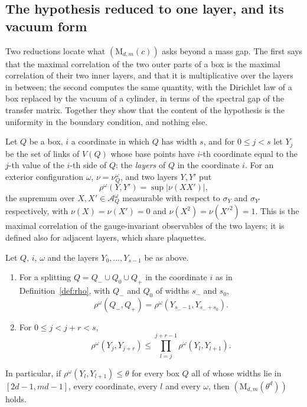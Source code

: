 \subsection{The hypothesis reduced to one layer, and its vacuum form}
\label{ssec:layers}

Two reductions locate what $(\mathrm M_{d,m}(c))$ asks beyond a mass gap.
The first says that the maximal correlation of the two outer parts of a box
is the maximal correlation of their two inner layers, and that it is
multiplicative over the layers in between; the second computes the same
quantity, with the Dirichlet law of a box replaced by the vacuum of a
cylinder, in terms of the spectral gap of the transfer matrix. Together they
show that the content of the hypothesis is the uniformity in the boundary
condition, and nothing else.

Let $Q$ be a box, $i$ a coordinate in which $Q$ has width $s$, and for
$0\le j<s$ let $Y_j$ be the set of links of $V(Q)$ whose base points have
$i$-th coordinate equal to the $j$-th value of the $i$-th side of $Q$: the
\emph{layers} of $Q$ in the coordinate $i$. For an exterior configuration
$\omega$, $\nu=\nu^\omega_Q$, and two layers $Y,Y'$ put
\[
\rho^\omega(Y,Y')=\sup|\nu(XX')|,
\]
the supremum over $X,X'\in\mathcal A^\omega_Q$ measurable with respect to
$\sigma_Y$ and $\sigma_{Y'}$ respectively, with $\nu(X)=\nu(X')=0$ and
$\nu(X^2)=\nu(X'^2)=1$. This is the maximal correlation of the gauge-invariant
observables of the two layers; it is defined also for adjacent layers,
which share plaquettes.

\begin{lemma}[layers]\label{lem:layers}
Let $Q$, $i$, $\omega$ and the layers $Y_0,\dots,Y_{s-1}$ be as above.
\begin{enumerate}[label=\textup{(\roman*)},leftmargin=*]
\item For a splitting $Q=Q_-\cup Q_0\cup Q_+$ in the coordinate $i$ as in
Definition~\textup{\ref{def:rho}}, with $Q_-$ and $Q_0$ of widths $s_-$ and
$s_0$,
\[
\rho^\omega(Q_-,Q_+)=\rho^\omega(Y_{s_--1},Y_{s_-+s_0}).
\]
\item For $0\le j<j+r<s$,
\[
\rho^\omega(Y_j,Y_{j+r})\le\prod_{l=j}^{j+r-1}\rho^\omega(Y_l,Y_{l+1}).
\]
\end{enumerate}
In particular, if $\rho^\omega(Y_l,Y_{l+1})\le\theta$ for every box $Q$ all
of whose widths lie in $[2d-1,md-1]$, every coordinate, every $l$ and every
$\omega$, then $(\mathrm M_{d,m}(\theta^d))$ holds.
\end{lemma}

